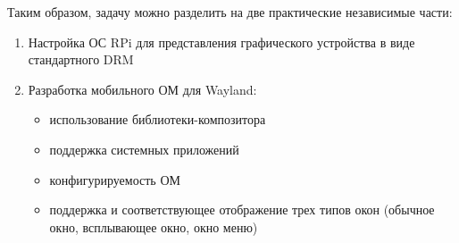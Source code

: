 \documentclass[11pt,a4paper]{extarticle}
\begin{document}
Таким образом, задачу можно разделить на две практические независимые части:
\begin{enumerate}
\item Настройка ОС RPi для представления графического устройства в виде стандартного DRM
\item Разработка мобильного ОМ для Wayland:
	\begin{itemize}
	\item использование библиотеки-композитора
	\item поддержка системных приложений
	\item конфигурируемость ОМ
	\item поддержка и соответствующее отображение трех типов окон (обычное окно, всплывающее окно, окно меню)
	\end{itemize}
\end{enumerate}
\end{document}
